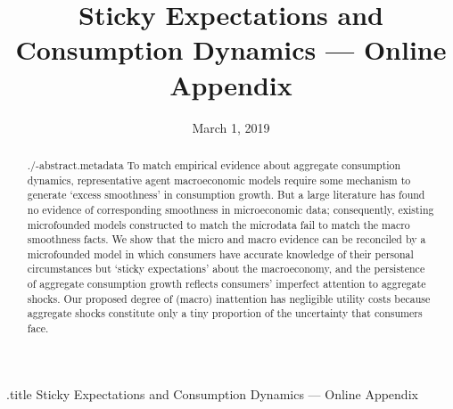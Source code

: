 \documentclass[titlepage]{\econtex}
\begin{document}

	
	
	
	\begin{verbatimwrite}{\jobname.title}
		Sticky Expectations and Consumption Dynamics --- Online Appendix
	\end{verbatimwrite}
	
	\hfill{\tiny \jobname}
	
	\title{Sticky Expectations and Consumption Dynamics --- Online Appendix}
	
	
	
	
	
	\date{March 1, 2019}
	\maketitle
	
	\hypertarget{Abstract}{}
	\begin{abstract}
		\begin{verbatimwrite}{./\jobname-abstract.metadata}
			To match empirical evidence about aggregate consumption dynamics, representative agent macroeconomic models require some mechanism to generate `excess smoothness' in consumption growth.   But a large literature has found no evidence of corresponding smoothness in microeconomic data; consequently, existing microfounded models constructed to match the microdata fail to match the macro smoothness facts.  We show that the micro and macro evidence can be reconciled by a microfounded model in which consumers have accurate knowledge of their personal circumstances but `sticky expectations' about the macroeconomy, and the persistence of aggregate consumption growth reflects consumers' imperfect attention to aggregate shocks. Our proposed degree of (macro) inattention has negligible utility costs because aggregate shocks constitute only a tiny proportion of the uncertainty that consumers face.
		\end{verbatimwrite}
		
	\end{abstract}
	
\end{document}
